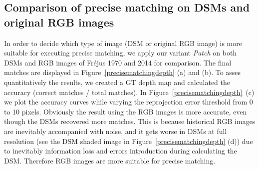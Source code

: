 \subsection{Comparison of precise matching on DSMs and original RGB images}
\label{CompareRGBDSM}
In order to decide which type of image (\ac{DSM} or original RGB image) is more suitable for executing precise matching, we apply our variant \textit{Patch} on both \ac{DSM}s and RGB images of Fr{\'e}jus 1970 and 2014 for comparison.
The final matches are displayed in Figure~\ref{precisematchingdepth} (a) and (b). 
To asses quantitatively the results, we created a \ac{GT} depth map and calculated the accuracy (correct matches / total matches). In Figure~\ref{precisematchingdepth}~(c) we plot the accuracy curves while varying the reprojection error threshold from 0 to 10 pixels. 
Obviously the result using the RGB images is more accurate, even though the \ac{DSM}s recovered more matches.
This is because historical RGB images are inevitably accompanied with noise, and it gets worse in \ac{DSM}s at full resolution (see the \ac{DSM} shaded image in Figure~\ref{precisematchingdepth} (d)) due to inevitably information loss and errors introduction during calculating the \ac{DSM}. Therefore RGB images are more suitable for precise matching.\\

